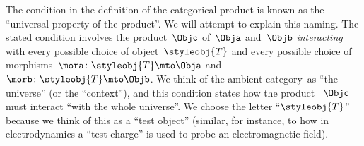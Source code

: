 \begin{remark}
	The condition in the definition of the categorical product is known as the ``universal property of the product''.
	We will attempt to explain this naming.
	The stated condition involves the product~$\Objc$ of~$\Obja$ and~$\Objb$ \emph{interacting} with every possible choice of object~$\styleobj{T}$ and every possible choice of morphisms~$\mora \colon \styleobj{T} \mto \Obja$ and~$\morb\colon \styleobj{T} \mto \Objb$.
	We think of the ambient category~\CatC as ``the universe'' (or the ``context''), and this condition states how the product ~$\Objc$ must interact ``with the whole universe''.
	We choose the letter ``$\styleobj{T}$'' because we think of this as a ``test object'' (similar, for instance,  to how in electrodynamics a ``test charge'' is used to probe an electromagnetic field).
\end{remark}


